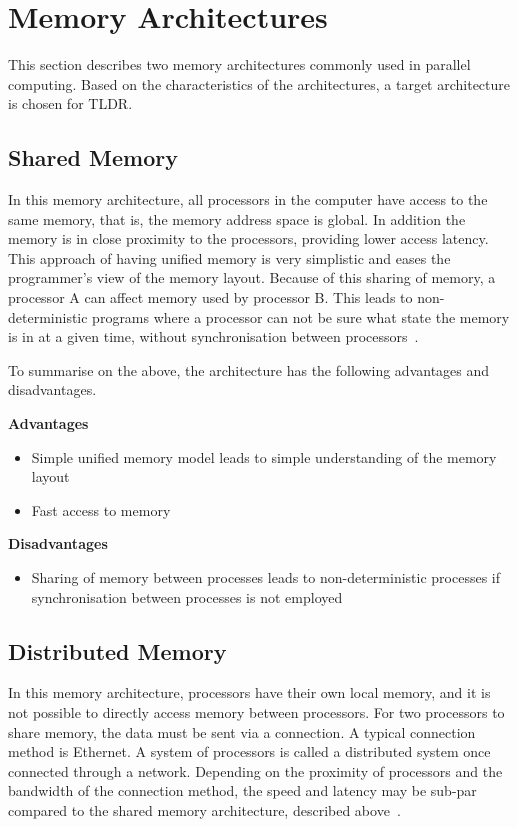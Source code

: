 \section{Memory Architectures}

This section describes two memory architectures commonly used in parallel computing. Based on the characteristics of the architectures, a target architecture is chosen for TLDR.

\subsection{Shared Memory}

In this memory architecture, all processors in the computer have access to the same memory, that is, the memory address space is global. In addition the memory is in close proximity to the processors, providing lower access latency. This approach of having unified memory is very simplistic and eases the programmer's view of the memory layout.
Because of this sharing of memory, a processor A can affect memory used by processor B. This leads to non-deterministic programs where a processor can not be sure what state the memory is in at a given time, without synchronisation between processors~\cite{compLLNL}. 

To summarise on the above, the architecture has the following advantages and disadvantages. 

\noindent\textbf{Advantages}
\begin{itemize}
    \item Simple unified memory model leads to simple understanding of the memory layout
    \item Fast access to memory
\end{itemize}

\noindent\textbf{Disadvantages}
\begin{itemize}
    \item Sharing of memory between processes leads to non-deterministic processes if synchronisation between processes is not employed
\end{itemize}

\subsection{Distributed Memory}

In this memory architecture, processors have their own local memory, and it is not possible to directly access memory between processors.
For two processors to share memory, the data must be sent via a connection. A typical connection method is Ethernet. A system of processors is called a distributed system once connected through a network. Depending on the proximity of processors and the bandwidth of the connection method, the speed and latency may be sub-par compared to the shared memory architecture, described above~\cite{compLLNL}.


